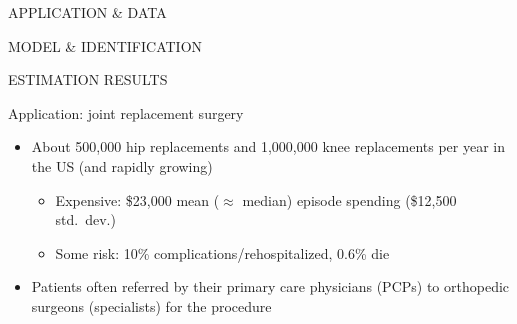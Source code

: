 \documentclass[slides, aspectratio=169]{beamer}
\newcommand{\bit}{\begin{itemize}}
\newcommand{\eit}{\end{itemize}}
\begin{document}

\begin{frame}
\begin{center}
\LARGE

\color{heritageblue}
APPLICATION \& DATA

\color{lightgray}
MODEL \& IDENTIFICATION

\color{lightgray}
ESTIMATION RESULTS

\end{center}
\end{frame}


\begin{frame}{Application: joint replacement surgery}
\begin{itemize}

\item About 500,000 hip replacements and 1,000,000 knee replacements per year in the US (and rapidly growing)
\bit
    \item Expensive: \$23,000 mean ($\approx$ median) episode spending (\$12,500 std.~dev.) 
    \item Some risk: 10\% complications/rehospitalized, 0.6\% die
\eit
\medskip

\item Patients often referred by their primary care physicians (PCPs) to orthopedic surgeons (specialists) for the procedure
\bigskip %

\end{itemize}
\end{frame}
\end{document}
